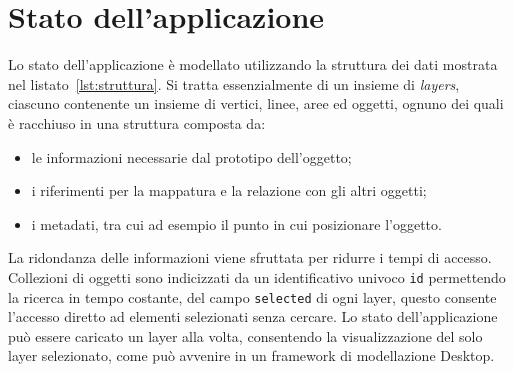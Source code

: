 \section{Stato dell'applicazione}
\label{sec:chapter_2_section_4}

Lo stato dell'applicazione è modellato utilizzando la struttura dei dati mostrata nel listato~\ref{lst:struttura}.
Si tratta essenzialmente di un insieme di \emph{layers}, ciascuno contenente un insieme di vertici, linee, aree
ed oggetti, ognuno dei quali è racchiuso in una struttura composta da:
\begin{itemize}
\item le informazioni necessarie dal prototipo dell'oggetto;
\item i riferimenti per la mappatura e la relazione con gli altri oggetti;
\item i metadati, tra cui ad esempio il punto in cui posizionare l'oggetto.
\end{itemize}

La ridondanza delle informazioni viene sfruttata per ridurre i tempi di accesso. Collezioni di oggetti
sono indicizzati da un identificativo univoco \texttt{id} permettendo la ricerca in tempo costante, del
campo \texttt{selected} di ogni layer, questo consente l'accesso diretto ad elementi selezionati senza cercare.
Lo stato dell'applicazione può essere caricato un layer alla volta, consentendo la visualizzazione del solo layer selezionato,
come può avvenire in un framework di modellazione Desktop.\\

\newpage


